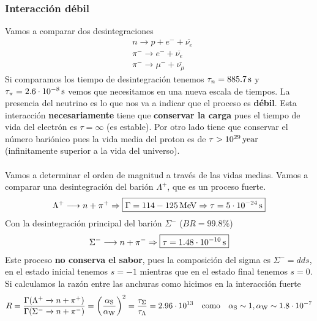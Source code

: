 \subsubsection{Interacción débil}
Vamos a comparar dos desintegraciones
\begin{equation*}
    \begin{aligned}
        &n\longrightarrow p+e^-+\overline{\nu_e} \\ 
        &\pi^- \longrightarrow e^- + \overline{\nu_e}\\
        &\pi^- \longrightarrow  \mu^- + \overline{\nu_\mu}
    \end{aligned}
\end{equation*}
Si comparamos los tiempo de desintegración tenemos $\tau_n=\unit[885.7]{s}$ y $\tau_\pi=\unit[2.6\cdot 10^{-8}]{s}$
vemos que necesitamos en una nueva escala de tiempos. La presencia del neutrino es lo que nos va a indicar que el proceso es \textbf{débil}.
\newpage
Esta interacción \textbf{necesariamente} tiene que \textbf{conservar la carga} pues el tiempo de vida del electrón es $\tau=\infty$ (es estable). Por otro lado tiene que conservar el número bariónico pues la vida media del proton es de $\tau>\unit[10^{29}]{year}$ (infinitamente superior a la vida del universo).\\\\
Vamos a determinar el orden de magnitud a través de las vidas medias. Vamos a comparar una desintegración del barión $\Lambda^+$, que es un proceso fuerte.
\begin{equation*}
    \Lambda^+\longrightarrow n+\pi^+ \Rightarrow
    \boxed{\Gamma=\unit[114-125]{MeV} \Rightarrow \tau=\unit[5\cdot10^{-24}]{s}}
\end{equation*}
Con la desintegración principal del barión $\Sigma^-$ ($BR=99.8\%$)
\begin{equation*}
    \Sigma^-\longrightarrow n+\pi^- \Rightarrow \boxed{\tau=\unit[1.48\cdot10^{-10}]{s}}
\end{equation*}
Este proceso \textbf{no conserva el sabor}, pues la composición del sigma es $\Sigma^-=dds$, en el estado inicial tenemos $s=-1$ mientras que en el estado final tenemos $s=0$. Si calculamos la razón entre las anchuras como hicimos en la interacción fuerte
\begin{equation*}
    R=\frac{\Gamma(\Lambda^+\xrightarrow{}n+\pi^+)}{\Gamma(\Sigma^-\xrightarrow{}n+\pi^-)}=\qty(\frac{\alpha_\mathrm{S}}{\alpha_\mathrm{W}})^2=\frac{\tau_\Sigma}{\tau_\Lambda}=2.96\cdot 10^{13} \quad \text{como} \quad \alpha_\mathrm{S}\sim 1, \alpha_\mathrm{W}\sim 1.8\cdot 10^{-7}
\end{equation*}
